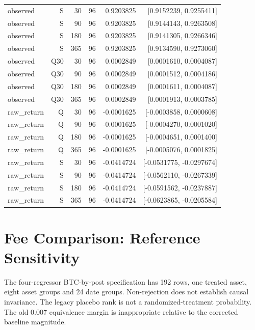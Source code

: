 \documentclass[10pt]{article}
\begin{document}
\begin{longtable}{lrrrrr}
observed & S & 30 & 96 & 0.9203825 & [0.9152239, 0.9255411] \\
observed & S & 90 & 96 & 0.9203825 & [0.9144143, 0.9263508] \\
observed & S & 180 & 96 & 0.9203825 & [0.9141305, 0.9266346] \\
observed & S & 365 & 96 & 0.9203825 & [0.9134590, 0.9273060] \\
observed & Q30 & 30 & 96 & 0.0002849 & [0.0001610, 0.0004087] \\
observed & Q30 & 90 & 96 & 0.0002849 & [0.0001512, 0.0004186] \\
observed & Q30 & 180 & 96 & 0.0002849 & [0.0001611, 0.0004087] \\
observed & Q30 & 365 & 96 & 0.0002849 & [0.0001913, 0.0003785] \\
raw\_return & Q & 30 & 96 & -0.0001625 & [-0.0003858, 0.0000608] \\
raw\_return & Q & 90 & 96 & -0.0001625 & [-0.0004270, 0.0001020] \\
raw\_return & Q & 180 & 96 & -0.0001625 & [-0.0004651, 0.0001400] \\
raw\_return & Q & 365 & 96 & -0.0001625 & [-0.0005076, 0.0001825] \\
raw\_return & S & 30 & 96 & -0.0414724 & [-0.0531775, -0.0297674] \\
raw\_return & S & 90 & 96 & -0.0414724 & [-0.0562110, -0.0267339] \\
raw\_return & S & 180 & 96 & -0.0414724 & [-0.0591562, -0.0237887] \\
raw\_return & S & 365 & 96 & -0.0414724 & [-0.0623865, -0.0205584] \\
\bottomrule\end{longtable}\normalsize

\section{Fee Comparison: Reference Sensitivity}
The four-regressor BTC-by-post specification has 192 rows, one treated asset, eight asset groups and 24 date groups. Non-rejection does not establish causal invariance. The legacy placebo rank is not a randomized-treatment probability. The old 0.007 equivalence margin is inappropriate relative to the corrected baseline magnitude.
\end{document}
